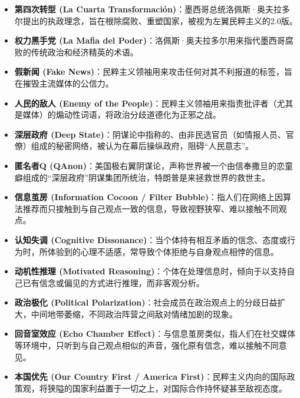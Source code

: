 \begin{itemize}
    \item \textbf{第四次转型 (La Cuarta Transformación)}：墨西哥总统洛佩斯·奥夫拉多尔提出的执政理念，旨在根除腐败、重塑国家，被视为左翼民粹主义的2.0版。

    \item \textbf{权力黑手党 (La Mafia del Poder)}：洛佩斯·奥夫拉多尔用来指代墨西哥腐败的传统政治和经济精英的术语。

    \item \textbf{假新闻 (Fake News)}：民粹主义领袖用来攻击任何对其不利报道的标签，旨在摧毁主流媒体的公信力。

    \item \textbf{人民的敌人 (Enemy of the People)}：民粹主义领袖用来指责批评者（尤其是媒体）的煽动性词语，将政治分歧道德化为正邪之战。

    \item \textbf{深层政府 (Deep State)}：阴谋论中指称的、由非民选官员（如情报人员、官僚）组成的秘密网络，被认为在幕后操纵政府，阻碍“人民意志”。

    \item \textbf{匿名者Q (QAnon)}：美国极右翼阴谋论，声称世界被一个由信奉撒旦的恋童癖组成的“深层政府”阴谋集团所统治，特朗普是来拯救世界的救世主。

    \item \textbf{信息茧房 (Information Cocoon / Filter Bubble)}：指人们在网络上因算法推荐而只接触到与自己观点一致的信息，导致视野狭窄、难以接触不同观点。

    \item \textbf{认知失调 (Cognitive Dissonance)}：当个体持有相互矛盾的信念、态度或行为时，所体验到的心理不适感，常导致个体拒绝与自身观点相悖的信息。

    \item \textbf{动机性推理 (Motivated Reasoning)}：个体在处理信息时，倾向于以支持自己已有信念或偏见的方式进行推理，而非客观分析。

    \item \textbf{政治极化 (Political Polarization)}：社会成员在政治观点上的分歧日益扩大，中间地带萎缩，不同政治阵营之间敌对情绪加剧的现象。

    \item \textbf{回音室效应 (Echo Chamber Effect)}：与信息茧房类似，指人们在社交媒体等环境中，只听到与自己观点相似的声音，强化原有信念，难以接触不同意见。

    \item \textbf{本国优先 (Our Country First / America First)}：民粹主义内向的国际政策观，将狭隘的国家利益置于一切之上，对国际合作持怀疑甚至敌视态度。


\end{itemize}

